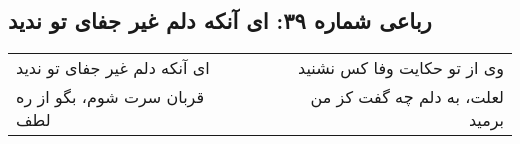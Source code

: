 \begin{center}
\section*{رباعی شماره ۳۹: ای آنکه دلم غیر جفای تو ندید}
\label{sec:039}
\begin{longtable}{l p{0.5cm} r}
ای آنکه دلم غیر جفای تو ندید
&&
وی از تو حکایت وفا کس نشنید
\\
قربان سرت شوم، بگو از ره لطف
&&
لعلت، به دلم چه گفت کز من برمید
\\
\end{longtable}
\end{center}
